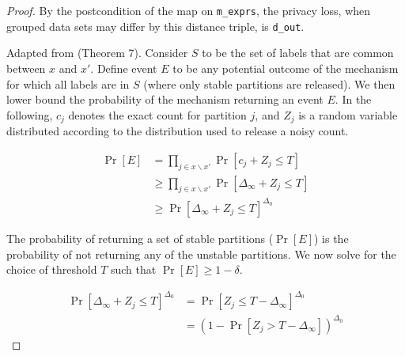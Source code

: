 \documentclass{article}
\begin{document}
\begin{proof}
By the postcondition of the map on \texttt{m\_exprs}, the privacy loss, 
when grouped data sets may differ by this distance triple,
is \texttt{d\_out}.



Adapted from \cite{rogers2023unifyingprivacyanalysisframework} (Theorem 7).
Consider $S$ to be the set of labels that are common between $x$ and $x'$.
Define event $E$ to be any potential outcome of the mechanism for which all labels are in $S$
(where only stable partitions are released).
We then lower bound the probability of the mechanism returning an event $E$.
In the following, $c_j$ denotes the exact count for partition $j$,
and $Z_j$ is a random variable distributed according to the distribution used to release a noisy count.

\begin{align*}
    \Pr[E] &= \prod_{j \in x \backslash x'} \Pr[c_j + Z_j \le T] \\
    &\ge \prod_{j \in x \backslash x'} \Pr[\Delta_\infty + Z_j \le T] \\
    &\ge \Pr[\Delta_\infty + Z_j \le T]^{\Delta_0}
\end{align*}

The probability of returning a set of stable partitions ($\Pr[E]$) 
is the probability of not returning any of the unstable partitions.
We now solve for the choice of threshold $T$ such that $\Pr[E] \ge 1 - \delta$.

\begin{align*}
    \Pr[\Delta_\infty + Z_j \le T]^{\Delta_0} &= \Pr[Z_j \le T - \Delta_\infty]^{\Delta_0} \\
    &= (1 - \Pr[Z_j > T - \Delta_\infty])^{\Delta_0}
\end{align*}


\end{proof}
\end{document}
